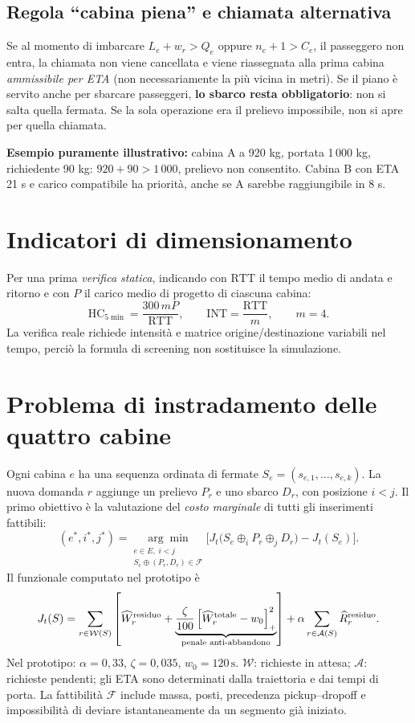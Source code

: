\documentclass[11pt,a4paper]{article}
\newcommand{\st}{\,\mathrm{s}}
\newcommand{\pos}[1]{\left[#1\right]_+}
\newcommand{\secname}[1]{\vspace{1mm}\section{#1}}
\begin{document}
\subsection*{Regola ``cabina piena'' e chiamata alternativa}
Se al momento di imbarcare \(L_e+w_r>Q_e\) oppure \(n_e+1>C_e\), il passeggero non entra, la chiamata non viene cancellata e viene riassegnata alla prima cabina \emph{ammissibile per ETA} (non necessariamente la pi\`u vicina in metri). Se il piano \`e servito anche per sbarcare passeggeri, \textbf{lo sbarco resta obbligatorio}: non si salta quella fermata. Se la sola operazione era il prelievo impossibile, non si apre per quella chiamata.

\textbf{Esempio puramente illustrativo:} cabina A a 920 kg, portata 1\,000 kg, richiedente 90 kg: \(920+90>1\,000\), prelievo non consentito. Cabina B con ETA 21 s e carico compatibile ha priorit\`a, anche se A sarebbe raggiungibile in 8 s.

\secname{Indicatori di dimensionamento}
Per una prima \emph{verifica statica}, indicando con \(\mathrm{RTT}\) il tempo medio di andata e ritorno e con \(P\) il carico medio di progetto di ciascuna cabina:
\begin{equation}
\mathrm{HC}_{5\min}=\frac{300\,mP}{\mathrm{RTT}},\qquad
\mathrm{INT}=\frac{\mathrm{RTT}}{m},\qquad m=4.
\end{equation}
La verifica reale richiede intensit\`a e matrice origine/destinazione variabili nel tempo, perci\`o la formula di screening non sostituisce la simulazione.
\newpage
\secname{Problema di instradamento delle quattro cabine}
Ogni cabina \(e\) ha una sequenza ordinata di fermate \(S_e=(s_{e,1},\ldots,s_{e,k})\). La nuova domanda \(r\) aggiunge un prelievo \(P_r\) e uno sbarco \(D_r\), con posizione \(i<j\). Il primo obiettivo \`e la valutazione del \emph{costo marginale} di tutti gli inserimenti fattibili:
\begin{equation}
(e^*,i^*,j^*)=\underset{\substack{e\in E,\;i<j\\S_e\oplus(P_r,D_r)\in\mathcal F}}{\arg\min}
\Big[J_t\big(S_e\oplus_i P_r\oplus_j D_r\big)-J_t(S_e)\Big].
\label{eq:dispatch}
\end{equation}
Il funzionale computato nel prototipo \`e
\begin{equation}
J_t(S)=\sum_{r\in\mathcal W(S)}\left[\widehat W_r^{\rm residuo}+
\underbrace{\frac{\zeta}{100}\pos{\widehat W_r^{\rm totale}-w_0}^{2}}_{\text{penale anti-abbandono}}\right]
+\alpha\sum_{r\in\mathcal A(S)}\widehat R_r^{\rm residuo}.
\label{eq:objective}
\end{equation}
Nel prototipo: \(\alpha=0{,}33\), \(\zeta=0{,}035\), \(w_0=120\st\). \(\mathcal W\): richieste in attesa; \(\mathcal A\): richieste pendenti; gli ETA sono determinati dalla traiettoria e dai tempi di porta. La fattibilit\`a \(\mathcal F\) include massa, posti, precedenza pickup--dropoff e impossibilit\`a di deviare istantaneamente da un segmento gi\`a iniziato.
\end{document}
